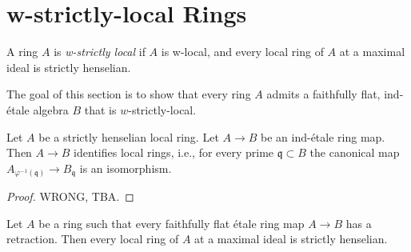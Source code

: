 \section{w-strictly-local Rings}

\begin{definition}
    A ring \(A\) is \emph{w-strictly local} if \(A\) is w-local, and every local ring of \(A\) at a maximal ideal is strictly henselian.
    \label{def:w-strictly-local-ring}
\end{definition}

The goal of this section is to show that every ring $A$ admits a faithfully flat, ind-étale algebra $B$ that is $w$-strictly-local.

\begin{lemma}
  \label{thm:ind-etale-strictly-henselian-identifies-local-rings}
  Let \(A\) be a strictly henselian local ring. Let \(A \to B\) be an ind-étale ring map. Then \(A \to B\) identifies local rings, i.e., for every prime \(\mathfrak{q} \subset B\) the canonical map \(A_{\varphi^{-1}(\mathfrak{q})} \to B_{\mathfrak{q}}\) is an isomorphism.
\end{lemma}

\begin{proof}
  WRONG, TBA.
\end{proof}

\begin{lemma}
    Let $A$ be a ring such that every faithfully flat étale ring map $A \to B$ has
    a retraction. Then every local ring of $A$ at a maximal ideal is strictly henselian.
    \label{lemma:retractions-strictly-henselian}
\end{lemma}

